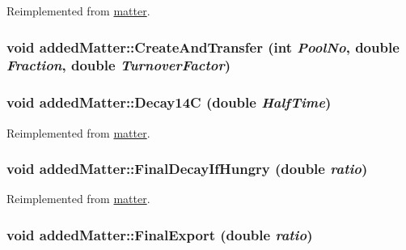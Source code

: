 Reimplemented from \hyperlink{classmatter_a2c91964d566a29807648e62548c6b159}{matter}.\hypertarget{classadded_matter_ae8c4ed6e7730e095e8b644efa46de5ba}{
\subsubsection[{CreateAndTransfer}]{\setlength{\rightskip}{0pt plus 5cm}void addedMatter::CreateAndTransfer (int {\em PoolNo}, \/  double {\em Fraction}, \/  double {\em TurnoverFactor})}}
\label{classadded_matter_ae8c4ed6e7730e095e8b644efa46de5ba}
\hypertarget{classadded_matter_ac3f88e4d8ae94d0b7f0fe1b06e33d345}{
\subsubsection[{Decay14C}]{\setlength{\rightskip}{0pt plus 5cm}void addedMatter::Decay14C (double {\em HalfTime})}}
\label{classadded_matter_ac3f88e4d8ae94d0b7f0fe1b06e33d345}


Reimplemented from \hyperlink{classmatter_aa5d1ab3edc35b1ade3f0714af81e3ab1}{matter}.\hypertarget{classadded_matter_a40c4a27c09387b87f804e1c3a48cf908}{
\subsubsection[{FinalDecayIfHungry}]{\setlength{\rightskip}{0pt plus 5cm}void addedMatter::FinalDecayIfHungry (double {\em ratio})}}
\label{classadded_matter_a40c4a27c09387b87f804e1c3a48cf908}


Reimplemented from \hyperlink{classmatter_a5f04a9ddefede46fd82848148a5fbab8}{matter}.\hypertarget{classadded_matter_a6c6bab5a53ecb7358459d44d29681c95}{
\subsubsection[{FinalExport}]{\setlength{\rightskip}{0pt plus 5cm}void addedMatter::FinalExport (double {\em ratio})}}
\label{classadded_matter_a6c6bab5a53ecb7358459d44d29681c95}


